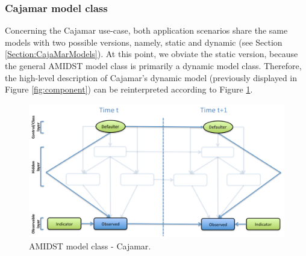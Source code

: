 \subsubsection{Cajamar model class}\label{cajamarAMIDSTModels}

Concerning the Cajamar use-case, both application scenarios share the same models with two possible versions, namely, static and dynamic (see Section \ref{Section:CajaMarModels}). At this point, we obviate the static version, because the general AMIDST model class is primarily a dynamic model class. Therefore, the high-level description of Cajamar's dynamic model (previously displayed in Figure \ref{fig:component}) can be reinterpreted according  to Figure \ref{Figure:AMIDSTModelClassCajamar}. 

\begin{figure}[ht!]
\begin{center}
\includegraphics[scale=0.39]{./figures/AMIDSTModelClassCajamar.png}
\caption{\label{Figure:AMIDSTModelClassCajamar} AMIDST model class - Cajamar.}
\end{center}
\end{figure}


